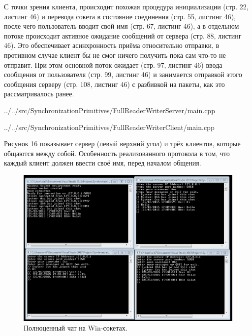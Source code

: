 \documentclass[a4paper, 12pt]{article}		%
\begin{document}
С точки зрения клиента, происходит похожая процедура инициализации (стр. 22, листинг 46) и перевода сокета в состояние соединения (стр. 55, листинг 46), после чего пользователь вводит свой имя (стр. 67, листинг 46), а в отдельном потоке происходит активное ожидание сообщений от сервера (стр. 88, листинг 46). Это обеспечивает асинхронность приёма относительно отправки, в противном случае клиент бы не смог ничего получить пока сам что-то не отправит. При этом основной поток ожидает (стр. 97, листинг 46) ввода сообщения от пользователя (стр. 99, листинг 46) и занимается отправкой этого сообщения серверу (стр. 108, листинг 46) с разбивкой на пакеты, как это рассматривалось ранее.



{../../src/SynchronizationPrimitives/FullReaderWriterServer/main.cpp}
\newpage


{../../src/SynchronizationPrimitives/FullReaderWriterClient/main.cpp}

Рисунок 16 показывает сервер (левый верхний угол) и трёх клиентов, которые общаются между собой. Особенность реализованного протокола в том, что каждый клиент должен ввести своё имя, перед началом общения.

\begin{figure}[h!]
\centering
\includegraphics[scale=0.7]{res/009}
\caption{Полноценный чат на Win-сокетах.}
\end{figure}

\newpage
\end{document}
